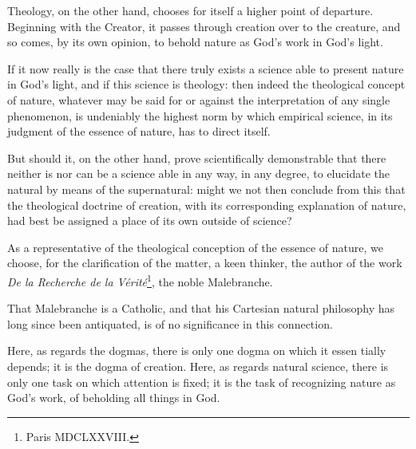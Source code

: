 \documentclass[12pt,a4paper]{article}
\begin{document}
Theology, on the other hand, chooses for itself a higher point of departure.
Beginning with the Creator, it passes through creation over to the creature, and
so comes, by its own opinion, to behold nature as God's work in God's light.

If it now really is the case that there truly exists a science able to present
nature in God's light, and if this science is theology: then indeed the
theological concept of nature, whatever may be said for or against the
interpretation of any single phenomenon, is undeniably the highest norm by which
empirical science, in its judgment of the essence of nature, has to direct
itself.

But should it, on the other hand, prove scientifically demonstrable that there
neither is nor can be a science able in any way, in any degree, to elucidate the
natural by means of the supernatural: might we not then conclude from this that
the theological doctrine of creation, with its corresponding explanation of
nature, had best be assigned a place of its own outside of science?

As a representative of the theological conception of the essence of nature, we
choose, for the clarification of the matter, a keen thinker, the author of the
work \emph{De la Recherche de la Vérité}\footnote{Paris MDCLXXVIII.}, the noble
Malebranche.

That Malebranche is a Catholic, and that his Cartesian natural philosophy has
long since been antiquated, is of no significance in this connection.

Here, as regards the dogmas, there is only one dogma on which it essen%
tially depends; it is the dogma of creation. Here, as regards natural science,
there is only one task on which attention is fixed; it is the task of recognizing
nature as God's work, of beholding all things in God.
\end{document}
